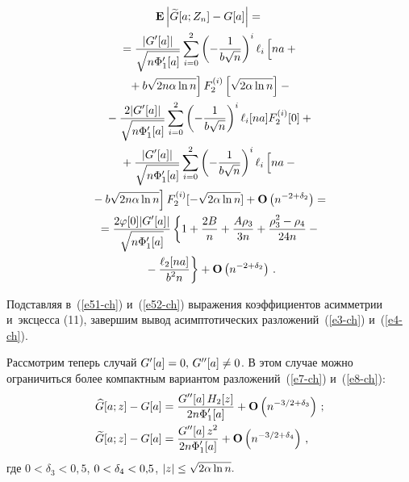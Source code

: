\begin{multicols}{2}
\noindent
 \begin{multline}
 \mathbf{E}\left|\widetilde{G}[a;Z_n]-G[a]\right|={}
\\
 {}=\fr{|G'[a]|}{\sqrt {n\Phi'_1[a]}}\sum\limits_{i=0}^2  \left(-\fr{1}{b\sqrt{n}}\right)^i
 \ell_i\left[
 \vphantom{b\sqrt{2n\alpha\ln n}}
 na+{}\right.\\
\left. {}+b\sqrt{2n\alpha\ln n}\right] F_2^{(i)}\left[\sqrt{2\alpha\ln n}\right]-{}
\\
{} -\fr{2|G'[a]|}{\sqrt {n\Phi'_1[a]}}\sum\limits_{i=0}^2
 \left(-\fr{1}{b\sqrt{n}}\right)^i \ell_i[na] F_2^{(i)}[0]+{}
 \\
{} +\fr{|G'[a]|}{\sqrt {n\Phi'_1[a]}}\sum\limits_{i=0}^2  
\left(-\fr{1}{b\sqrt{n}}\right)^i
 \ell_i\left[
 \vphantom{b\sqrt{2n\alpha\ln n}}
 na-{}\right.\\
\left. {}-b\sqrt{2n\alpha\ln n}\right] F_2^{(i)}[-\sqrt{2\alpha\ln n}]
 +\mathbf{O}\left(n^{-2+\delta_2}\right)={}
\\
{} =\fr{2\varphi[0]|G'[a]|}{\sqrt{n\Phi'_1[a]}}
  \left\{1+\fr{2B}{n}+\fr{A\rho_3}{3n} +\fr{\rho_3^2-\rho_4}{24n}
  -{}\right.\\
\left.  {}-\fr{\ell_2[na]}{b^2 n} \right\}+\mathbf{O}\left(n^{-2+\delta_2}\right)\,.
 \label{e52-ch}
 \end{multline}


 Подставляя в~(\ref{e51-ch}) и~(\ref{e52-ch}) выражения коэффициентов асимметрии и~эксцесса (11),
 завершим вывод асимптотических разложений~(\ref{e3-ch}) и~(\ref{e4-ch}).

 Рассмотрим теперь случай $G'[a]\hm=0,\,G''[a]\hm\neq 0$. В этом случае можно
 ограничиться более компактным вариантом разложений~(\ref{e7-ch}) и~(\ref{e8-ch}):
   \begin{align}
 \widehat{G}[a;z]-G[a]&=\displaystyle\frac{\displaystyle  G''[a]\, H_2[z]\mathstrut}{\displaystyle 2n\Phi'_1[a]\mathstrut}
  + \mathbf{O}\left( {n^{- 3/2+\delta_3} } \right)\,;
\label{e53-ch}
 \\ 
 \widetilde{G}[a;z]-G[a]&=  \displaystyle\frac{\displaystyle G''[a]\, z^2 \mathstrut}{\displaystyle 2n\Phi'_1[a] \mathstrut}
  + \mathbf{O}\left( {n^{- 3/2+\delta_4} } \right)\,,
 \label{e54-ch}
 \end{align}
 где $0<\delta_3<0{,}5$, $0\hm<\delta_4\hm<0{,}5$, $|z|\hm\le \sqrt{2\alpha\ln n}.$


\end{multicols}
